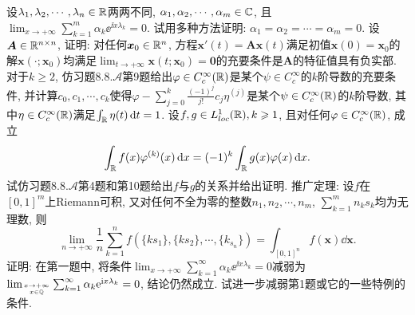 \begin{quizb}
\woe 设\(\lambda_1,\lambda_2,\cdots,\lambda_n\in\mathbb{R}\)两两不同, \(\alpha_1,\alpha_2,\cdots,\alpha_m\in\mathbb{C}\), 且\(\lim_{x\rightarrow+\infty}\sum_{k=1}^{m}\alpha_k\ee^{\ii x\lambda_k}=0.\) 试用多种方法证明: \(\alpha_1=\alpha_2=\cdots=\alpha_m=0.\)
\woe 设\(\boldsymbol{A}\in\mathbb{R}^{n\times n}\), 证明: 对任何\(\boldsymbol{x}_0\in\mathbb{R}^n\), 方程\(\boldsymbol{x}'(t)=\boldsymbol{Ax}(t)\)满足初值\(\boldsymbol{x}(0)=\boldsymbol{x}_0\)的解\(\boldsymbol{x}(\cdot;\boldsymbol{x}_0)\)均满足\(\lim_{t\rightarrow+\infty}\boldsymbol{x}(t;\boldsymbol{x}_0)=\boldsymbol{0}\)的充要条件是\(\boldsymbol{A}\)的特征值具有负实部.
\woe 对于\(k\geqslant 2\), 仿习题8.8.\(\boldsymbol{\mathscr{A}}\)第9题给出\(\varphi\in C_c^{\infty}(\mathbb{R})\)是某个\(\psi\in C_c^{\infty}\)的\(k\)阶导数的充要条件, 并计算\(c_0,c_1,\cdots,c_k\)使得\(\varphi-\sum_{j=0}^{k}\frac{(-1)^j}{j!}c_j\eta^{(j)}\)是某个\(\psi\in C_c^{\infty}(\mathbb{R})\)的\(k\)阶导数, 其中\(\eta\in C_c^{\infty}(\mathbb{R})\)满足\(\int_{\mathbb{R}}\eta(t)\,\mathrm{d} t=1\).
\woe 设\(f,g\in L_{loc}^1(\mathbb{R}),k\geqslant 1\), 且对任何\(\varphi\in C_c^{\infty}(\mathbb{R})\), 成立\[\int_{\mathbb{R}}f(x)\varphi^{(k)}(x)\,\mathrm{d} x=(-1)^k\int_{\mathbb{R}}g(x)\varphi(x)\,\mathrm{d} x.\]试仿习题8.8.\(\boldsymbol{\mathcal{A}}\)第4题和第10题给出\(f\)与\(g\)的关系并给出证明.
\woe 推广定理: 设\(f\)在\([0,1]^m\)上Riemann可积, 又对任何不全为零的整数\(n_1,n_2,\cdots,n_m\), \(\sum_{k=1}^{m}n_ks_k\)均为无理数, 则\[\lim_{n\rightarrow+\infty}\frac{1}{n}\sum_{k=1}^{n}f\left(\{ks_1\},\{ks_2\},\cdots,\{k_{s_n}\}\right)=\int_{[0,1]^n}f(\boldsymbol{x})\dd\boldsymbol{x}.\]
\woe 证明: 在第一题中, 将条件\(\lim_{x\rightarrow+\infty}\sum_{k=1}^{\infty}\alpha_k\ee^{\ii x\lambda_k}=0\)减弱为\(\lim_{x\rightarrow+\infty\atop x\in\mathbb{Q}}\sum_{k=1}^{\infty}\alpha_k\mathrm{e}^{\mathrm{i} x\lambda_k}=0\), 结论仍然成立.
\woe 试进一步减弱第1题或它的一些特例的条件.
\end{quizb}
